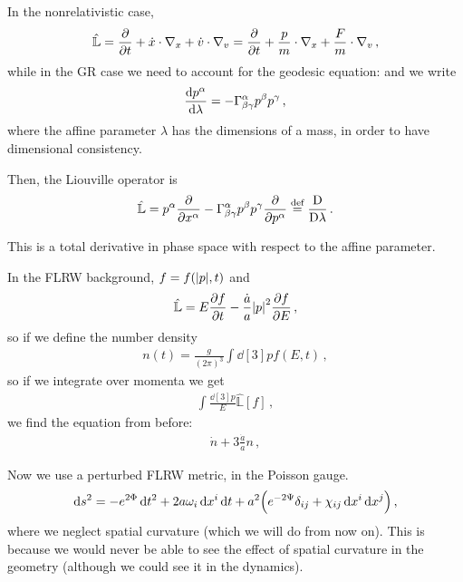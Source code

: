 \documentclass[main.tex]{subfiles}
\begin{document}
In the nonrelativistic case, 
%
\begin{align}
\hat{\mathbb{L}} = \pdv{}{t} + \dot{x} \cdot \nabla_{x} + \dot{v} \cdot \nabla_{v} = \pdv{}{t} + \frac{p}{m} \cdot \nabla_{x} + \frac{F}{m} \cdot \nabla_{v} 
\,,
\end{align}
%
while in the GR case we need to account for the geodesic equation: and we write 
%
\begin{align}
\dv{p^{\alpha }}{\lambda } = - \Gamma^{\alpha }_{\beta \gamma } p^{\beta } p^{\gamma }
\,,
\end{align}
%
where the affine parameter \(\lambda \) has the dimensions of a mass, in order to have dimensional consistency.

Then, the Liouville operator is 
%
\begin{align}
\hat{\mathbb{L}} = p^{\alpha } \pdv{}{x^{\alpha }}-  
\Gamma^{\alpha }_{\beta \gamma } p^{\beta } p^{\gamma } \pdv{}{p^{\alpha }} \overset{\text{def}}{=} \frac{\mathrm{D}}{\mathrm{D}\lambda }
\,.
\end{align}

This is a total derivative in phase space with respect to the affine parameter. 

In the FLRW background, \(f = f(\abs{p}, t)\) and 
%
\begin{align}
\hat{\mathbb{L}} = E \pdv{f}{t} - \frac{\dot{a}}{a} \abs{p}^2 \pdv{f}{E}
\,,
\end{align}
%
so if we define the number density 
%
\begin{align}
n(t) = \frac{g}{(2\pi )^3} \int \dd[3]{p} f(E, t)
\,,
\end{align}
%
so if we integrate over momenta we get 
%
\begin{align}
\int \frac{ \dd[3]{p}}{E} \hat{\mathbb{L}}[f] 
\,,
\end{align}
%
we find the equation from before: 
%
\begin{align}
\dot{n} + 3 \frac{\dot{a}}{a} n 
\,,
\end{align}
%

Now we use a perturbed FLRW metric, in the Poisson gauge.  
%
\begin{align}
\dd{s^2} = - e^{2 \Phi } \dd{t^2} 
+ 2 a \omega_{i} \dd{x^{i}} \dd{t} + a^2
\qty(e^{-2 \Psi } \delta_{ij} + \chi_{ij} \dd{x^{i}} \dd{x^{j}})
\,,
\end{align}
%
where we neglect spatial curvature (which we will do from now on). 
This is because we would never be able to see the effect of spatial curvature in the geometry (although we could see it in the dynamics). 
\end{document}

